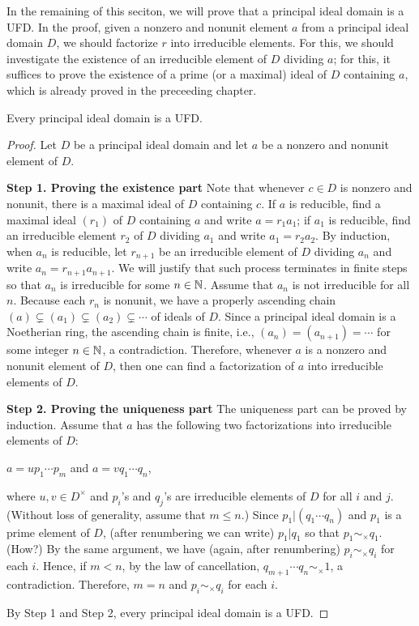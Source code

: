 In the remaining of this seciton, we will prove that a principal ideal domain is a UFD.
In the proof, given a nonzero and nonunit element $a$ from a principal ideal domain $D$, we should factorize $r$ into irreducible elements.
For this, we should investigate the existence of an irreducible element of $D$ dividing $a$; for this, it suffices to prove the existence of a prime (or a maximal) ideal of $D$ containing $a$, which is already proved in the preceeding chapter.
\begin{thm}
    Every principal ideal domain is a UFD.
\end{thm}
\begin{proof}
    Let $D$ be a principal ideal domain and let $a$ be a nonzero and nonunit element of $D$.

    \textbf{Step 1. Proving the existence part}\newline\noindent
    Note that whenever $c\in D$ is nonzero and nonunit, there is a maximal ideal of $D$ containing $c$.
    If $a$ is reducible, find a maximal ideal $(r_1)$ of $D$ containing $a$ and write $a=r_1a_1$; if $a_1$ is reducible, find an irreducible element $r_2$ of $D$ dividing $a_1$ and write $a_1=r_2a_2$.
    By induction, when $a_n$ is reducible, let $r_{n+1}$ be an irreducible element of $D$ dividing $a_n$ and write $a_n=r_{n+1}a_{n+1}$.
    We will justify that such process terminates in finite steps so that $a_n$ is irreducible for some $n\in{\mathbb{N}}$.
    Assume that $a_n$ is not irreducible for all $n$.
    Because each $r_n$ is nonunit, we have a properly ascending chain $(a)\subsetneq (a_1)\subsetneq (a_2)\subsetneq\cdots$ of ideals of $D$.
    Since a principal ideal domain is a Noetherian ring, the ascending chain is finite, i.e., $(a_n)=(a_{n+1})=\cdots$ for some integer $n\in{\mathbb{N}}$, a contradiction.
    Therefore, whenever $a$ is a nonzero and nonunit element of $D$, then one can find a factorization of $a$ into irreducible elements of $D$.

    \textbf{Step 2. Proving the uniqueness part}\newline\noindent
    The uniqueness part can be proved by induction.
    Assume that $a$ has the following two factorizations into irreducible elements of $D$:
    \begin{center}
        $a=u p_1 \cdots p_m$ and $a=v q_1 \cdots q_n$,
    \end{center}
    where $u, v\in D^\times$ and $p_i$'s and $q_j$'s are irreducible elements of $D$ for all $i$ and $j$. (Without loss of generality, assume that $m\leq n$.)
    Since $p_1|(q_1\cdots q_n)$ and $p_1$ is a prime element of $D$, (after renumbering we can write) $p_1|q_1$ so that $p_1\sim_\times q_1$. \color{brown}(How?) \color{black}
    By the same argument, we have (again, after renumbering) $p_i\sim_\times q_i$ for each $i$.
    Hence, if $m<n$, by the law of cancellation, $q_{m+1}\cdots q_n\sim_\times 1$, a contradiction.
    Therefore, $m=n$ and $p_i\sim_\times q_i$ for each $i$.

    By Step 1 and Step 2, every principal ideal domain is a UFD.
\end{proof}